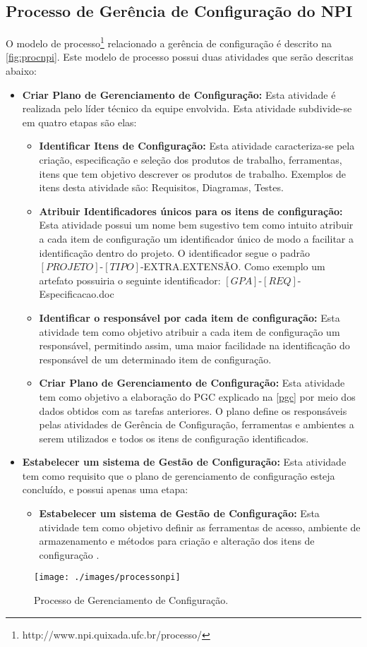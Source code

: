 \subsection{Processo de Gerência de Configuração do NPI}
O modelo de processo\footnote{http://www.npi.quixada.ufc.br/processo/} relacionado a gerência de configuração é descrito na \autoref{fig:procnpi}. Este modelo de processo possui duas atividades que serão descritas abaixo:
\begin{itemize}
\item \textbf{Criar Plano de Gerenciamento de Configuração:} Esta atividade é realizada pelo líder técnico da equipe envolvida. Esta atividade subdivide-se em quatro etapas são elas:
\begin{itemize}
\item \textbf{Identificar Itens de Configuração:} Esta atividade caracteriza-se pela criação, especificação e seleção dos produtos de trabalho, ferramentas, itens que tem objetivo descrever os produtos de trabalho. Exemplos de itens desta atividade são: Requisitos, Diagramas, Testes.

\item \textbf{Atribuir Identificadores únicos para os itens de configuração:} Esta atividade possui um nome bem sugestivo tem como intuito atribuir a cada item de configuração um identificador único de modo a facilitar a identificação dentro do projeto. O identificador segue o padrão $\left[PROJETO\right]$-$\left[TIPO\right]$-EXTRA.EXTENSÃO. Como exemplo um artefato possuiria o seguinte identificador: $\left[GPA\right]$-$\left[REQ\right]$-Especificacao.doc

\item \textbf{Identificar o responsável por cada item de configuração:} Esta atividade tem como objetivo atribuir a cada item de configuração um responsável, permitindo assim, uma maior facilidade na identificação do responsável de um determinado item de configuração.
\item \textbf{Criar	Plano de Gerenciamento de Configuração:} Esta atividade tem como objetivo a elaboração do PGC explicado na \autoref{pgc} por meio dos dados obtidos com as tarefas anteriores. O plano define os responsáveis pelas atividades de Gerência de Configuração, ferramentas e ambientes a serem utilizados e todos os itens de configuração identificados.
\end{itemize}
\item \textbf{Estabelecer um sistema de Gestão de Configuração:} Esta atividade tem como requisito que o plano de gerenciamento de configuração esteja concluído, e possui apenas uma etapa:
\begin{itemize}
\item \textbf{Estabelecer um sistema de Gestão de Configuração:} Esta atividade tem como objetivo definir as ferramentas de acesso, ambiente de armazenamento e métodos para criação e alteração dos itens de configuração \cite{processonpi}. 
\end{itemize}
\end{itemize}

\begin{figure}[H]
\centering
\caption[Processo de Gerenciamento de Configuração]{Processo de Gerenciamento de Configuração.}
\texttt{[image: ./images/processonpi]}
\label{fig:procnpi}
\end{figure}

